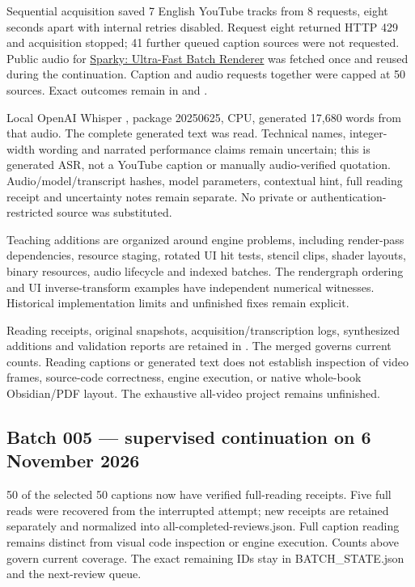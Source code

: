 Sequential acquisition saved 7 English YouTube tracks from 8 requests, eight seconds apart with internal retries disabled. Request eight returned HTTP 429 and acquisition stopped; 41 further queued caption sources were not requested. Public audio for \href{https://www.youtube.com/watch?v=ImtWD_9OAeY}{Sparky: Ultra-Fast Batch Renderer} was fetched once and reused during the continuation. Caption and audio requests together were capped at 50 sources. Exact outcomes remain in  and .

Local OpenAI Whisper , package 20250625, CPU, generated 17,680 words from that audio. The complete generated text was read. Technical names, integer-width wording and narrated performance claims remain uncertain; this is generated ASR, not a YouTube caption or manually audio-verified quotation. Audio/model/transcript hashes, model parameters, contextual hint, full reading receipt and uncertainty notes remain separate. No private or authentication-restricted source was substituted.

Teaching additions are organized around engine problems, including render-pass dependencies, resource staging, rotated UI hit tests, stencil clips, shader layouts, binary resources, audio lifecycle and indexed batches. The rendergraph ordering and UI inverse-transform examples have independent numerical witnesses. Historical implementation limits and unfinished fixes remain explicit.

Reading receipts, original snapshots, acquisition/transcription logs, synthesized additions and validation reports are retained in . The merged  governs current counts. Reading captions or generated text does not establish inspection of video frames, source-code correctness, engine execution, or native whole-book Obsidian/PDF layout. The exhaustive all-video project remains unfinished.

\subsection{Batch 005 --- supervised continuation on 6 November 2026}\label{appendix-877738f6f4d2-batch-005-supervised-continuation-on-6-november-2026}

\hypertarget{appendix-877738f6f4d2-batch-005-supervised-continuation-on-6-november-2026}{}

50 of the selected 50 captions now have verified full-reading receipts. Five full reads were recovered from the interrupted attempt; new receipts are retained separately and normalized into all-completed-reviews.json. Full caption reading remains distinct from visual code inspection or engine execution. Counts above govern current coverage. The exact remaining IDs stay in BATCH\_STATE.json and the next-review queue.

